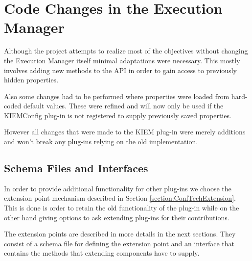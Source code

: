 \chapter{Code Changes in the Execution Manager}
\label{chapter:KiemChanges}
Although the project attempts to realize most of the objectives without
changing the Execution Manager itself minimal adaptations were necessary.
This mostly involves adding new methods to the \ac{API} in order to
gain access to previously hidden properties.

Also some changes had to be performed where properties were loaded from hard-coded 
default values. These were refined and will now only be used if the \ac{KIEMConfig} 
plug-in is not registered to supply previously saved properties.

However all changes that were made to the \ac{KIEM} plug-in were merely additions
and won't break any plug-ins relying on the old implementation.

\section{Schema Files and Interfaces}
In order to provide additional functionality for other plug-ins we choose the extension
point mechanism described in Section \ref{section:ConfTechExtension}. This is done
is order to retain the old functionality of the plug-in while on the other hand giving
options to ask extending plug-ins for their contributions. 

The extension points are described in more details in the next sections. They consist
of a schema file for defining the extension point and an interface that contains the 
methods that extending components have to supply.

